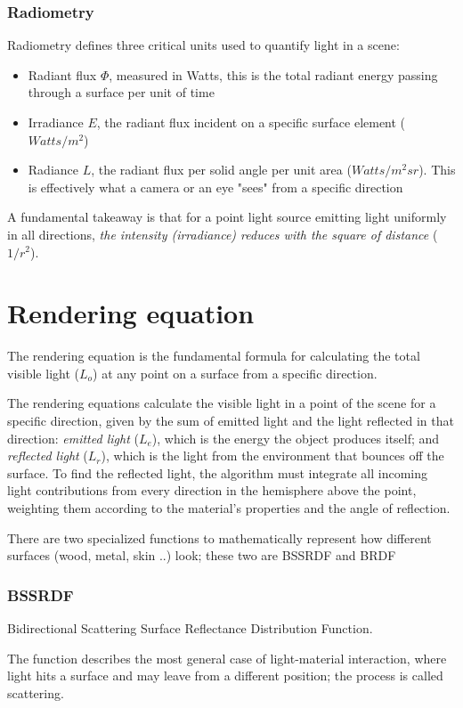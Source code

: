 \subsubsection{Radiometry}
Radiometry defines three critical units used to quantify light in a scene:
\begin{itemize}[noitemsep]
    \item Radiant flux \(\Phi\), measured in Watts, this is the total radiant energy passing through a surface per unit of time
    \item Irradiance \(E\), the radiant flux incident on a specific surface element (\(Watts/m^2\))
    \item Radiance \(L\), the radiant flux per solid angle per unit area (\(Watts/m^2sr\)). This is effectively what a camera or an eye "sees" from a specific direction
\end{itemize}

A fundamental takeaway is that for a point light source emitting light uniformly in all directions, \textit{the intensity (irradiance) reduces with the square of distance} (\(1/r^2\)).

\section{Rendering equation}
\begin{definition}
    The rendering equation is the fundamental formula for calculating the total visible light (\(L_o\)) at any point on a surface from a specific direction. 
\end{definition}

The rendering equations calculate the visible light in a point of the scene for a specific direction, given by the sum of emitted light and the light reflected in that direction: \textit{emitted light} (\(L_e\)), which is the energy the object produces itself; and \textit{reflected light} (\(L_r\)), which is the light from the environment that bounces off the surface. To find the reflected light, the algorithm must integrate all incoming light contributions from every direction in the hemisphere above the point, weighting them according to the material's properties and the angle of reflection.\par
There are two specialized functions to mathematically represent how different surfaces (wood, metal, skin ..) look; these two are BSSRDF and BRDF

\subsubsection{BSSRDF}
Bidirectional Scattering Surface Reflectance Distribution Function.\par
The function describes the most general case of light-material interaction, where light hits a surface and may leave from a different position; the process is called scattering.


